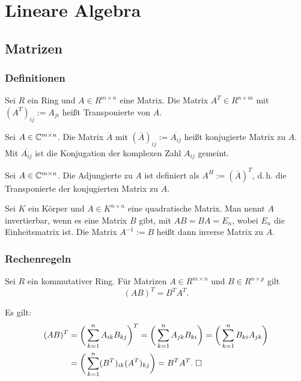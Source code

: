 
\chapter{Lineare Algebra}
\section{Matrizen}
\subsection{Definitionen}
\begin{Definition}%
Sei $R$ ein Ring und $A\in R^{m\times n}$ eine Matrix.
Die Matrix $A^T\in R^{n\times m}$ mit $(A^T)_{ij} := A_{ji}$
heißt Transponierte von $A$.
\end{Definition}

\begin{Definition}%
Sei $A\in\mathbb C^{m\times n}$. Die Matrix $\overline A$ mit
$(\overline A)_{ij} := \overline{A_{ij}}$
heißt konjugierte Matrix zu $A$. Mit $\overline{A_{ij}}$ ist
die Konjugation der komplexen Zahl $A_{ij}$ gemeint.
\end{Definition}

\begin{Definition}%
Sei $A\in\mathbb C^{m\times n}$. Die Adjungierte zu $A$ ist
definiert als $A^H:=(\overline A)^T$, d.\,h.
die Transponierte der konjugierten Matrix zu $A$.
\end{Definition}

\begin{Definition}%
\label{matrix-inv}
Sei $K$ ein Körper und $A\in K^{n\times n}$ eine quadratische
Matrix. Man nennt $A$ invertierbar, wenn es eine Matrix $B$ gibt,
mit $AB=BA=E_n$, wobei $E_n$ die Einheitsmatrix ist. Die Matrix
$A^{-1}:=B$ heißt dann inverse Matrix zu $A$.
\end{Definition}

\subsection{Rechenregeln}

\begin{Korollar}\label{matrix-mul-tp}
Sei $R$ ein kommutativer Ring. Für Matrizen $A\in R^{m\times n}$ und
$B\in R^{n\times p}$ gilt
\[(AB)^T = B^T A^T.\]
\end{Korollar}
\begin{Beweis} Es gilt:
\begin{align}
(AB)^T &= \bigg(\sum_{k=1}^n A_{ik}B_{kj}\bigg)^T
= \bigg(\sum_{k=1}^n A_{jk}B_{ki}\bigg)
= \bigg(\sum_{k=1}^n B_{ki} A_{jk}\bigg)\\
&= \bigg(\sum_{k=1}^n (B^T)_{ik} (A^T)_{kj}\bigg)
= B^T A^T.\;\square
\end{align}
\end{Beweis}

